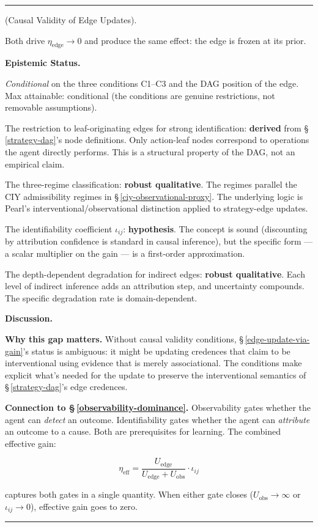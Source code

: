 \documentclass[11pt,oneside]{article}
\newcounter{claim}[section]
\renewcommand{\theclaim}{\thesection.\arabic{claim}}
\newenvironment{segment}[2]{%
  \refstepcounter{claim}%
  \bigskip\noindent\hrule\smallskip
  \noindent{\bfseries #1~\theclaim}\enskip(#2).\par\smallskip
  \noindent\ignorespaces
}{%
  \par\smallskip\noindent\hrule\bigskip
}
\newenvironment{scope}[1][]{\begin{segment}{Scope}{#1}}{\end{segment}}
\begin{document}
\begin{scope}[Causal Validity of Edge Updates]
Both drive $\eta_{\text{edge}} \to 0$ and produce the same effect: the edge is frozen at its prior.


\medskip\noindent\textbf{Epistemic Status.}


\textit{Conditional} on the three conditions C1–C3 and the DAG position of the edge. Max attainable: conditional (the conditions are genuine restrictions, not removable assumptions).

The restriction to leaf-originating edges for strong identification: \textbf{derived} from \S\,\ref{strategy-dag}'s node definitions. Only action-leaf nodes correspond to operations the agent directly performs. This is a structural property of the DAG, not an empirical claim.

The three-regime classification: \textbf{robust qualitative}. The regimes parallel the CIY admissibility regimes in \S\,\ref{ciy-observational-proxy}. The underlying logic is Pearl's interventional/observational distinction applied to strategy-edge updates.

The identifiability coefficient $\iota_{ij}$: \textbf{hypothesis}. The concept is sound (discounting by attribution confidence is standard in causal inference), but the specific form — a scalar multiplier on the gain — is a first-order approximation.

The depth-dependent degradation for indirect edges: \textbf{robust qualitative}. Each level of indirect inference adds an attribution step, and uncertainty compounds. The specific degradation rate is domain-dependent.


\medskip\noindent\textbf{Discussion.}


\textbf{Why this gap matters.} Without causal validity conditions, \S\,\ref{edge-update-via-gain}'s status is ambiguous: it might be updating credences that claim to be interventional using evidence that is merely associational. The conditions make explicit what's needed for the update to preserve the interventional semantics of \S\,\ref{strategy-dag}'s edge credences.

\textbf{Connection to \S\,\ref{observability-dominance}.} Observability gates whether the agent can \textit{detect} an outcome. Identifiability gates whether the agent can \textit{attribute} an outcome to a cause. Both are prerequisites for learning. The combined effective gain:

$$\eta_{\text{eff}} = \frac{U_{\text{edge}}}{U_{\text{edge}} + U_{\text{obs}}} \cdot \iota_{ij}$$

captures both gates in a single quantity. When either gate closes ($U_{\text{obs}} \to \infty$ or $\iota_{ij} \to 0$), effective gain goes to zero.


\end{scope}
\end{document}
